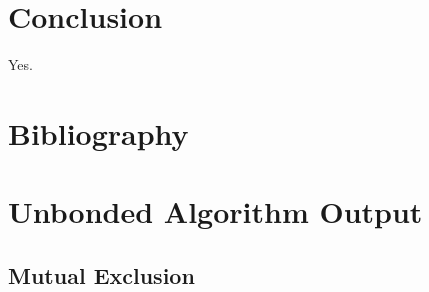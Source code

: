\documentclass{llncs}
\begin{document}
\section{Conclusion}

Yes.

\section{Bibliography}




\appendix

\section{Unbonded Algorithm Output}

\subsection{Mutual Exclusion \label{mc:app:unb:mutex}}
\end{document}
